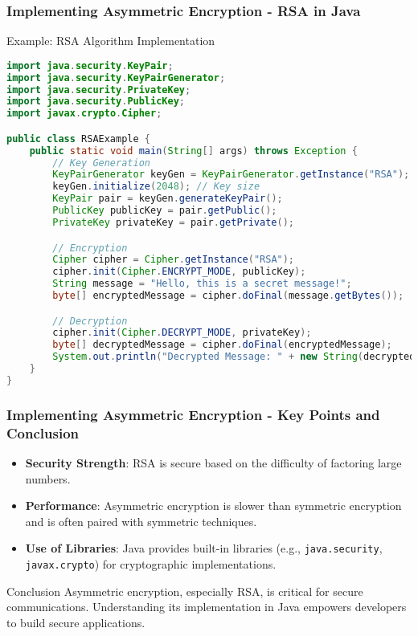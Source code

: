 \documentclass{beamer}
\begin{document}
\begin{frame}[fragile]
    \frametitle{Implementing Asymmetric Encryption - RSA in Java}
    \begin{block}{Example: RSA Algorithm Implementation}
    \begin{lstlisting}[language=Java]
import java.security.KeyPair;
import java.security.KeyPairGenerator;
import java.security.PrivateKey;
import java.security.PublicKey;
import javax.crypto.Cipher;

public class RSAExample {
    public static void main(String[] args) throws Exception {
        // Key Generation
        KeyPairGenerator keyGen = KeyPairGenerator.getInstance("RSA");
        keyGen.initialize(2048); // Key size
        KeyPair pair = keyGen.generateKeyPair();
        PublicKey publicKey = pair.getPublic();
        PrivateKey privateKey = pair.getPrivate();

        // Encryption
        Cipher cipher = Cipher.getInstance("RSA");
        cipher.init(Cipher.ENCRYPT_MODE, publicKey);
        String message = "Hello, this is a secret message!";
        byte[] encryptedMessage = cipher.doFinal(message.getBytes());

        // Decryption
        cipher.init(Cipher.DECRYPT_MODE, privateKey);
        byte[] decryptedMessage = cipher.doFinal(encryptedMessage);
        System.out.println("Decrypted Message: " + new String(decryptedMessage));
    }
}
    \end{lstlisting}
    \end{block}
\end{frame}

\begin{frame}[fragile]
    \frametitle{Implementing Asymmetric Encryption - Key Points and Conclusion}
    \begin{itemize}
        \item \textbf{Security Strength}: RSA is secure based on the difficulty of factoring large numbers.
        \item \textbf{Performance}: Asymmetric encryption is slower than symmetric encryption and is often paired with symmetric techniques.
        \item \textbf{Use of Libraries}: Java provides built-in libraries (e.g., \texttt{java.security}, \texttt{javax.crypto}) for cryptographic implementations.
    \end{itemize}
    \begin{block}{Conclusion}
        Asymmetric encryption, especially RSA, is critical for secure communications. Understanding its implementation in Java empowers developers to build secure applications.
    \end{block}
\end{frame}
\end{document}
